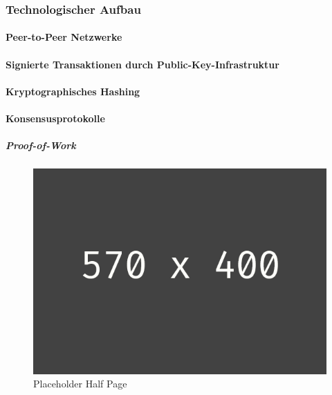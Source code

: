 \subsubsection{Technologischer Aufbau}

\paragraph{Peer-to-Peer Netzwerke}

\paragraph{Signierte Transaktionen durch Public-Key-Infrastruktur}

\paragraph{Kryptographisches Hashing}

\paragraph{Konsensusprotokolle}

\subparagraph{Proof-of-Work}
\begin{figure}[h!]
	\centering
	\includegraphics[width=1.0\linewidth]{pictures/placeholder_half_page}
	\caption[Placeholder Half Page]{Placeholder Half Page}
	\label{fig:placeholder_half_page}
\end{figure}

